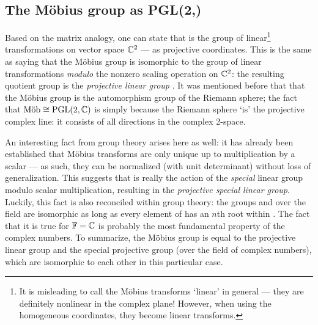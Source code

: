 \subsection{The Möbius group as PGL(2,\complex)} 
Based on the matrix analogy, one can state that \moebiusgroup is the group of linear\footnote{It is misleading to call the Möbius transforms `linear' in general --- they are definitely nonlinear in the complex plane! However, when using the homogeneous coordinates, they become linear transforms.} transformations on vector space \(\complex^2\) --- as projective coordinates. This is the same as saying that the Möbius group is isomorphic to the group of linear transformations \emph{modulo} the nonzero scaling operation on \(\complex^2\): the resulting quotient group is the \emph{projective linear group} . It was mentioned before that that the Möbius group is the automorphism group of the Riemann sphere; the fact that $\moebiusgroup \cong \pglgroup{2}{\complex}$ is simply because the Riemann sphere `is' the projective complex line: it consists of all directions in the complex 2-space.

An interesting fact from group theory arises here as well: it has already been established that Möbius transforms are only unique up to multiplication by a scalar --- as such, they can be normalized (with unit determinant) without loss of generalization. This suggests that \moebiusgroup is really the action of the \emph{special} linear group modulo scalar multiplication, resulting in the \emph{projective special linear group}. Luckily, this fact is also reconciled within group theory: the groups  and  over the field \field are isomorphic as long as every element of \field has an \(n\)th root within \field. The fact that it is true for \(\field = \complex\) is probably the most fundamental property of the complex numbers. To summarize, the Möbius group \moebiusgroup is equal to the projective linear group and the special projective group (over the field of complex numbers), which are isomorphic to each other in this particular case.


